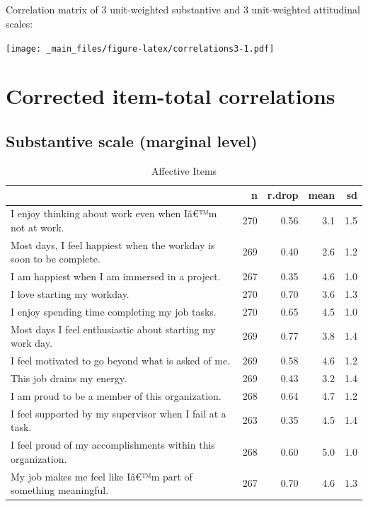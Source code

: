 \documentclass[
]{book}
\begin{document}
\hypertarget{section}{%
\section*{}\label{section}}

Correlation matrix of 3 unit-weighted substantive and 3 unit-weighted attitudinal scales:

\texttt{[image: \_main\_files/figure-latex/correlations3-1.pdf]}

\hypertarget{rdrops}{%
\chapter{Corrected item-total correlations}\label{rdrops}}

\hypertarget{substantive-scale-marginal-level}{%
\section{Substantive scale (marginal level)}\label{substantive-scale-marginal-level}}

\begin{table}

\caption{\label{tab:rdrop1}Affective Items}
\centering
\begin{tabular}[t]{l|r|r|r|r}
\hline
  & n & r.drop & mean & sd\\
\hline
I enjoy thinking about work even when Iâ€™m not at work. & 270 & 0.56 & 3.1 & 1.5\\
\hline
Most days, I feel happiest when the workday is soon to be complete. & 269 & 0.40 & 2.6 & 1.2\\
\hline
I am happiest when I am immersed in a project. & 267 & 0.35 & 4.6 & 1.0\\
\hline
I love starting my workday. & 270 & 0.70 & 3.6 & 1.3\\
\hline
I enjoy spending time completing my job tasks. & 270 & 0.65 & 4.5 & 1.0\\
\hline
Most days I feel enthusiastic about starting my work day. & 269 & 0.77 & 3.8 & 1.4\\
\hline
I feel motivated to go beyond what is asked of me. & 269 & 0.58 & 4.6 & 1.2\\
\hline
This job drains my energy. & 269 & 0.43 & 3.2 & 1.4\\
\hline
I am proud to be a member of this organization. & 268 & 0.64 & 4.7 & 1.2\\
\hline
I feel supported by my supervisor when I fail at a task. & 263 & 0.35 & 4.5 & 1.4\\
\hline
I feel proud of my accomplishments within this organization. & 268 & 0.60 & 5.0 & 1.0\\
\hline
My job makes me feel like Iâ€™m part of something meaningful. & 267 & 0.70 & 4.6 & 1.3\\
\hline
\end{tabular}
\end{table}
\end{document}

